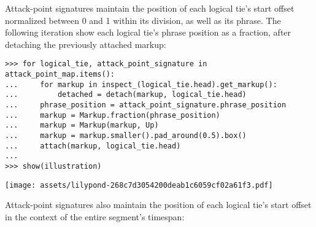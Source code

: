 \noindent Attack-point signatures maintain the position of each logical tie's
start offset normalized between 0 and 1 within its division, as well as its
phrase. The following iteration show each logical tie's phrase position as a
fraction, after detaching the previously attached markup:

\begin{comment}
<abjad>[stylesheet=../consort.ily]
for logical_tie, attack_point_signature in attack_point_map.items():
    for markup in inspect_(logical_tie.head).get_markup():
        detached = detach(markup, logical_tie.head)
    phrase_position = attack_point_signature.phrase_position
    markup = Markup.fraction(phrase_position)
    markup = Markup(markup, Up)
    markup = markup.smaller().pad_around(0.5).box()
    attach(markup, logical_tie.head)

show(illustration)
</abjad>
\end{comment}

\begin{abjadbookoutput}
\begin{singlespacing}
\vspace{-0.5\baselineskip}
\begin{lstlisting}
>>> for logical_tie, attack_point_signature in attack_point_map.items():
...     for markup in inspect_(logical_tie.head).get_markup():
...         detached = detach(markup, logical_tie.head)
...     phrase_position = attack_point_signature.phrase_position
...     markup = Markup.fraction(phrase_position)
...     markup = Markup(markup, Up)
...     markup = markup.smaller().pad_around(0.5).box()
...     attach(markup, logical_tie.head)
...
>>> show(illustration)
\end{lstlisting}
\noindent\texttt{[image: assets/lilypond-268c7d3054200deab1c6059cf02a61f3.pdf]}
\end{singlespacing}
\end{abjadbookoutput}

\noindent Attack-point signatures also maintain the position of each logical
tie's start offset in the context of the entire segment's timespan:

\begin{comment}
<abjad>[stylesheet=../consort.ily]
for logical_tie, attack_point_signature in attack_point_map.items():
    for markup in inspect_(logical_tie.head).get_markup():
        detached = detach(markup, logical_tie.head)
    segment_position = attack_point_signature.segment_position
    markup = Markup.fraction(segment_position)
    markup = Markup(markup, Up)
    markup = markup.smaller().pad_around(0.5).box()
    attach(markup, logical_tie.head)

show(illustration)
</abjad>
\end{comment}

